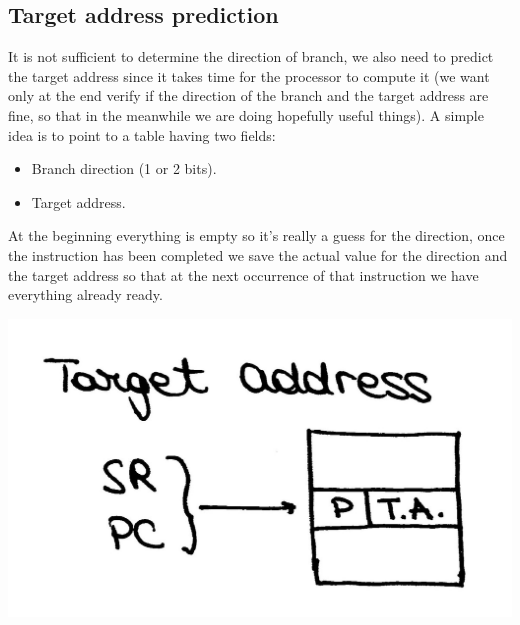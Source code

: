 \subsection{Target address prediction}
It is not sufficient to determine the direction of branch, we also need to
predict the target address since it takes time for the processor to compute
it (we want only at the end verify if the direction of the branch and the
target address are fine, so that in the meanwhile we are doing hopefully useful
things).
A simple idea is to point to a table having two fields:
\begin{itemize}
  \item Branch direction (1 or 2 bits).
  \item Target address.
\end{itemize}
At the beginning everything is empty so it's really a guess for the direction,
once the instruction has been completed we save the actual value for the
direction and the target address so that at the next occurrence of that
instruction we have everything already ready.
\begin{center}
  \includegraphics[width=0.5\linewidth]{img/img3/25}
\end{center}
